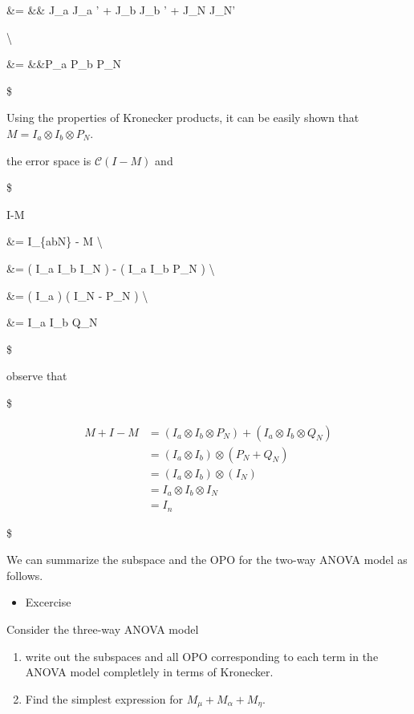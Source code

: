 \documentclass[
]{book}
\providecommand{\tightlist}{%
  \setlength{\itemsep}{0pt}\setlength{\parskip}{0pt}}
\begin{document}
{{{\&=
\&\& J\_a J\_a ' +  J\_b J\_b ' +  J\_N J\_N'

\textbackslash{}

\&=
\&\&P\_a \otimes P\_b \otimes P\_N

\$

Using the properties of Kronecker products, it can be easily shown that \(M = I_a \otimes I_b \otimes P_N\).

the error space is \(\mathcal{C}(I-M)\) and

\$

I-M

\&= I\_\{abN\} - M \textbackslash{}

\&= ( I\_a \otimes I\_b \otimes I\_N ) - ( I\_a \otimes I\_b \otimes P\_N ) \textbackslash{}

\&= ( I\_a \otimes  ) \otimes ( I\_N - P\_N ) \textbackslash{}

\&= I\_a \otimes I\_b \otimes Q\_N

\$

observe that

\$

\begin{align}

M + I - M &= ( I_a \otimes I_b \otimes P_N ) + (I_a \otimes I_b \otimes Q_N) \\

&= ( I_a \otimes I_b) \otimes(P_N + Q_N) \\

&= ( I_a \otimes I_b) \otimes (I_N) \\

&= I_a \otimes I_b \otimes I_N \\

&= I_n

\end{align}

\$

We can summarize the subspace and the OPO for the two-way ANOVA model as follows.

\begin{itemize}
\tightlist
\item
  Excercise
\end{itemize}

Consider the three-way ANOVA model

\begin{enumerate}
\def\labelenumi{\arabic{enumi}.}
\item
  write out the subspaces and all OPO corresponding to each term in the ANOVA model completlely in terms of Kronecker.
\item
  Find the simplest expression for \(M_\mu + M_\alpha + M_\eta\).
\end{enumerate}

}}}
\end{document}
